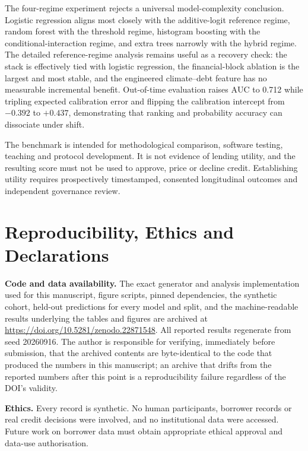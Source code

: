 \documentclass[journal]{IEEEtran}
\newcommand{\auc}{\mbox{AUC}}
\begin{document}
The four-regime experiment rejects a universal model-complexity conclusion. Logistic regression aligns most closely with the additive-logit reference regime, random forest with the threshold regime, histogram boosting with the conditional-interaction regime, and extra trees narrowly with the hybrid regime. The detailed reference-regime analysis remains useful as a recovery check: the stack is effectively tied with logistic regression, the financial-block ablation is the largest and most stable, and the engineered climate--debt feature has no measurable incremental benefit. Out-of-time evaluation raises $\auc$ to 0.712 while tripling expected calibration error and flipping the calibration intercept from $-0.392$ to $+0.437$, demonstrating that ranking and probability accuracy can dissociate under shift.

The benchmark is intended for methodological comparison, software testing, teaching and protocol development. It is not evidence of lending utility, and the resulting score must not be used to approve, price or decline credit. Establishing utility requires prospectively timestamped, consented longitudinal outcomes and independent governance review.

\section*{Reproducibility, Ethics and Declarations}

\textbf{Code and data availability.} The exact generator and analysis implementation used for this manuscript, figure scripts, pinned dependencies, the synthetic cohort, held-out predictions for every model and split, and the machine-readable results underlying the tables and figures are archived at \url{https://doi.org/10.5281/zenodo.22871548}. All reported results regenerate from seed 20260916. The author is responsible for verifying, immediately before submission, that the archived contents are byte-identical to the code that produced the numbers in this manuscript; an archive that drifts from the reported numbers after this point is a reproducibility failure regardless of the DOI's validity.

\textbf{Ethics.} Every record is synthetic. No human participants, borrower records or real credit decisions were involved, and no institutional data were accessed. Future work on borrower data must obtain appropriate ethical approval and data-use authorisation.
\end{document}
